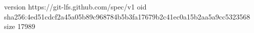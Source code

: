 version https://git-lfs.github.com/spec/v1
oid sha256:4ed51cdcf2a45a05b89c968784b5b3fa17679b2c41ec0a15b2aa5a9cc5323568
size 17989
